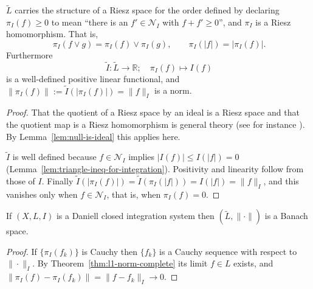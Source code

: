 \begin{lemma}\label{lem:quotient-riesz}
  $\widetilde{L}$ carries the structure of a Riesz space for the order defined by
  declaring $\pi_I(f)\ge0$ to mean ``there is an $f'\in\mathcal{N}_I$ with
  $f+f'\ge0$'', and $\pi_I$ is a Riesz homomorphism.
  That is,
  \[
    \pi_I(f\vee g)=\pi_I(f)\vee\pi_I(g),
    \qquad
    \pi_I(|f|)=|\pi_I(f)| .
  \]
  Furthermore
  \[
    \widetilde{I}:\widetilde{L}\to\mathbb{R};\quad \pi_I(f)\mapsto I(f)
  \]
  is a well-defined positive linear functional, and
  $\|\pi_I(f)\|:=\widetilde{I}(|\pi_I(f)|)=\|f\|_I$ is a norm.
\end{lemma}
\begin{proof}
  That the quotient of a Riesz space by an ideal is a Riesz space and that the
  quotient map is a Riesz homomorphism is general theory (see for instance
  \cite{LuxemburgZaanen}).
  By Lemma~\ref{lem:null-is-ideal} this applies here.

  $\widetilde{I}$ is well defined because $f\in\mathcal{N}_I$ implies
  $|I(f)|\le I(|f|)=0$
  (Lemma~\ref{lem:triangle-ineq-for-integration}).
  Positivity and linearity follow from those of $I$.
  Finally
  $\widetilde{I}(|\pi_I(f)|)=\widetilde{I}(\pi_I(|f|))=I(|f|)=\|f\|_I$, and this
  vanishes only when $f\in\mathcal{N}_I$, that is, when $\pi_I(f)=0$.
\end{proof}

\begin{lemma}\label{lem:quotient-is-banach}
  If $(X,L,I)$ is a Daniell closed integration system then
  $(\widetilde{L},\|\cdot\|)$ is a Banach space.
\end{lemma}
\begin{proof}
  If $\{\pi_I(f_k)\}$ is Cauchy then $\{f_k\}$ is a Cauchy sequence with respect
  to $\|\cdot\|_I$.
  By Theorem~\ref{thm:l1-norm-complete} its limit $f\in L$ exists, and
  $\|\pi_I(f)-\pi_I(f_k)\|=\|f-f_k\|_I\to0$.
\end{proof}

